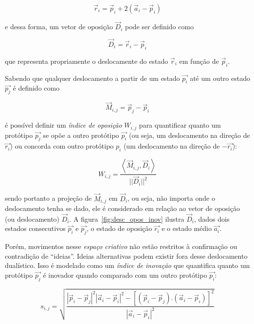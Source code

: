 \begin{equation}
\vec{r}_i = \vec{p}_i + 2(\vec{a}_i - \vec{p}_i)
\end{equation}

\noindent e dessa forma, um vetor de oposição $\vec{D}_i$ pode ser definido como

\begin{equation}
\vec{D}_i=\vec{r}_i - \vec{p}_i
\end{equation}

\noindent que representa propriamente o deslocamente do estado $\vec{r}_i$ em
função de $\vec{p}_i$.

Sabendo que qualquer deslocamento a partir de um estado $\vec{p_i}$ até um outro
estado $\vec{p_j}$ é definido como

\begin{equation}
\vec{M}_{i,j} = \vec{p}_j - \vec{p}_i
\end{equation}

\noindent é possível definir um \emph{índice de oposição} $W_{i,j}$ para
quantificar quanto um protótipo $\vec{p_j}$ se opõe a outro protótipo $\vec{p_i}$ (ou seja,
um deslocamento na direção de $\vec{r_i}$) ou concorda com outro protótipo $p_i$
(um deslocamento na direção de $-\vec{r_i}$):

\begin{equation}
W_{i,j} = \frac{\left< \vec{M}_{i,j}, \vec{D}_i\right>}{||\vec{D}_i||^2}
\end{equation}

\noindent sendo portanto a projeção de $\vec{M}_{i,j}$ em $\vec{D}_i$, ou seja,
não importa onde o deslocamento tenha se dado, ele é considerado em relação ao
vetor de oposição (ou deslocamento) $\vec{D}_i$. A
figura~\ref{fig:desc_opos_inov} ilustra $\vec{D}_i$, dados dois estados
consecutivos $\vec{p_i}$ e $\vec{p_j}$, o estado de oposição $\vec{r_i}$ e o
estado médio $\vec{a_i}$.

Porém, movimentos nesse \textit{espaço criativo} não estão restritos à
confirmação ou contradição de ``ideias''. Ideias alternativas podem existir fora
desse deslocamento dualístico. Isso é modelado como um \emph{índice de inovação}
que quantifica quanto um protótipo $\vec{p_j}$ é inovador quando comparado com um
outro protótipo $\vec{p_i}$:


\begin{equation}
s_{i,j} = \sqrt{\frac{|\vec{p}_i-\vec{p}_j|^2
          |\vec{a}_i-\vec{p}_i|^2 - 
          [(\vec{p}_i-\vec{p}_j) . 
            (\vec{a}_i-\vec{p}_i)]^2}
        {|\vec{a}_i-\vec{p}_i|^2}}
\end{equation}

